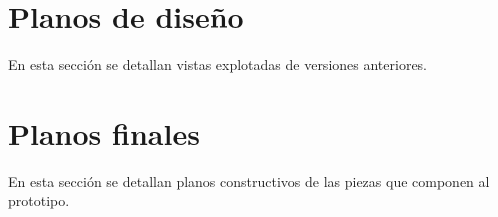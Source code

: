 \section{Planos de diseño}
En esta sección se detallan vistas explotadas de versiones anteriores.






\section{Planos finales}
En esta sección se detallan planos constructivos de las piezas que componen al prototipo.



















% 

